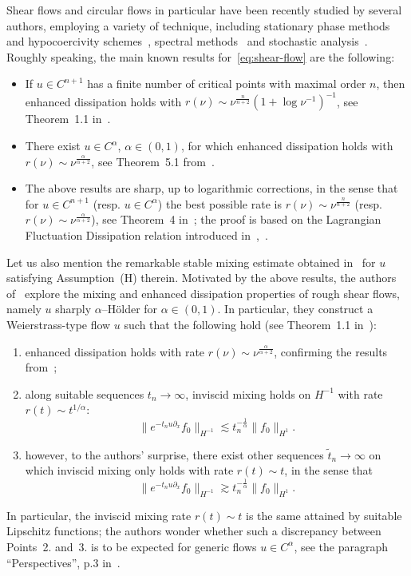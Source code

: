 \documentclass[11pt,oneside,reqno]{amsart}
\newenvironment{enumeratenumeric}{\begin{enumerate}[1.] }{\end{enumerate}}
\numberwithin{equation}{section}
\begin{document}
Shear flows and circular flows in particular have been recently studied by
several authors, employing a variety of technique, including stationary phase
methods and hypocoercivity
schemes~{\cite{bedrossian2017enhanced,zelati2020stable,zelati2020separation}},
spectral methods~{\cite{wei}} and stochastic analysis~{\cite{zelatidrivas}}.
Roughly speaking, the main known results for~\eqref{eq:shear-flow} are the
following:
\begin{itemize}
  \item If $u \in C^{n + 1}$ has a finite number of critical points with
  maximal order $n$, then enhanced dissipation holds with $r (\nu) \sim
  \nu^{\frac{n}{n + 2}} (1 + \log \nu^{- 1})^{- 1}$, see Theorem~1.1
  in~{\cite{bedrossian2017enhanced}}.
  
  \item There exist $u \in C^{\alpha}$, $\alpha \in (0, 1)$, for which
  enhanced dissipation holds with $r (\nu) \sim \nu^{\frac{\alpha}{\alpha +
  2}}$, see Theorem~5.1 from~{\cite{wei}}.
  
  \item The above results are sharp, up to logarithmic corrections, in the
  sense that for $u \in C^{n + 1}$ (resp. $u \in C^{\alpha}$) the best
  possible rate is $r (\nu) \sim \nu^{\frac{n}{n + 2}}$ (resp. $r (\nu) \sim
  \nu^{\frac{\alpha}{\alpha + 2}}$), see Theorem~4 in~{\cite{zelatidrivas}};
  the proof is based on the Lagrangian Fluctuation Dissipation relation
  introduced in~{\cite{drivas1}},~{\cite{drivas2}}.
\end{itemize}
Let us also mention the remarkable stable mixing estimate obtained
in~{\cite{zelati2020stable}} for $u$ satisfying Assumption~(H) therein.
Motivated by the above results, the authors of~{\cite{colombozelati}} explore
the mixing and enhanced dissipation properties of rough shear flows, namely
$u$ sharply $\alpha$--H\"{o}lder for $\alpha \in (0, 1)$. In particular, they
construct a Weierstrass-type flow $u$ such that the following hold (see
Theorem~1.1 in~{\cite{colombozelati}}):
\begin{enumeratenumeric}
  \item enhanced dissipation holds with rate $r (\nu) \sim
  \nu^{\frac{\alpha}{\alpha + 2}}$, confirming the results from~{\cite{wei}};
  
  \item along suitable sequences $t_n \rightarrow \infty$, inviscid mixing
  holds on $H^{- 1}$ with rate $r (t) \sim t^{1 / \alpha}$:
  \[ \| e^{- t_n u \partial_x} f_0 \|_{H^{- 1}} \lesssim t_n^{-
     \frac{1}{\alpha}}  \| f_0 \|_{H^1} . \]
  \item however, to the authors' surprise, there exist other sequences
  $\tilde{t}_n \rightarrow \infty$ on which inviscid mixing only holds with
  rate $r (t) \sim t$, in the sense that
  \[ \| e^{- t_n u \partial_x} f_0 \|_{H^{- 1}} \gtrsim t_n^{-
     \frac{1}{\alpha}}  \| f_0 \|_{H^1} . \]
\end{enumeratenumeric}
In particular, the inviscid mixing rate $r (t) \sim t$ is the same attained by
suitable Lipschitz functions; the authors wonder whether such a discrepancy
between Points~2. and~3. is to be expected for generic flows $u \in
C^{\alpha}$, see the paragraph ``Perspectives'', p.3
in~{\cite{colombozelati}}.
\end{document}
